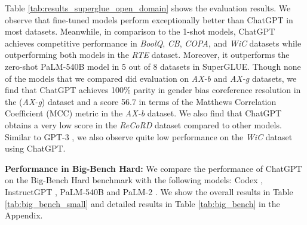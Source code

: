 \documentclass[11pt]{article}
\begin{document}
  Table \ref{tab:results_superglue_open_domain} shows the evaluation results. We observe that fine-tuned models perform exceptionally better than ChatGPT in most datasets. Meanwhile, in comparison to the 1-shot models, ChatGPT achieves competitive performance in \emph{BoolQ}, \emph{CB}, \emph{COPA}, and \emph{WiC} datasets while outperforming both models in the \emph{RTE} dataset. Moreover, it outperforms the zero-shot PaLM-540B model in 5 out of 8 datasets in SuperGLUE. Though none of the models that we compared did evaluation on \emph{AX-b} and \emph{AX-g} datasets, we find that ChatGPT achieves 100\% parity in gender bias coreference resolution in the (\emph{AX-g}) dataset and a score 56.7 in terms of the Matthews Correlation Coefficient (MCC) metric in the \emph{AX-b} dataset. We also find that ChatGPT obtains a very low score in the \emph{ReCoRD} dataset compared to other models. Similar to GPT-3 \cite{GPT3}, we also observe quite low performance on the \emph{WiC} dataset using ChatGPT. \begin{table*}
    \centering
    \setlength{\tabcolsep}{2pt}
\caption{\small{Averaged performance on the tasks from the \textbf{Big Bench Hard} benchmark. Here,  \textit{AO}, \textit{CoT}, and \textit{ZS} refer to \textit{Answer Only}, \textit{Chain-of-Thought}, and \textit{Zero-Shot} results, respectively. All the results are few-shot except the results in the \emph{ZS} column.}}
\label{tab:big_bench_small}
\end{table*} 
\textbf{Performance in Big-Bench Hard:}
We compare the performance of ChatGPT on the Big-Bench Hard benchmark with the following models: Codex \cite{chen2021evaluatinghuman}, InstructGPT \cite{instructGPT,GPT3}, PaLM-540B \cite{chowdhery2022palm} and PaLM-2 \cite{palm2}. We show the overall results in Table \ref{tab:big_bench_small} and detailed results in Table \ref{tab:big_bench} in the Appendix. 
\end{document}
